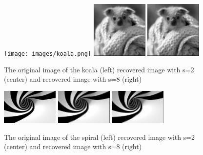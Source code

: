 \documentclass{article}
\begin{document}
\begin{figure}[h]
    \captionsetup{width=.5\linewidth}
    \centering
        \texttt{[image: images/koala.png]}
        \includegraphics[width=0.25\textwidth]{images/koala-recovered_02.png}
        \includegraphics[width=0.25\textwidth]{images/koala-recovered_08.png}
        \caption{The original image of the koala (left) recovered image with s=2 (center) and recovered image with s=8 (right)}
\end{figure}

\begin{figure}[h]
    \captionsetup{width=.5\linewidth}
    \centering
        \includegraphics[width=0.25\textwidth]{images/spiral.png}
        \includegraphics[width=0.25\textwidth]{images/spiral-recovered_02.png}
        \includegraphics[width=0.25\textwidth]{images/spiral-recovered_08.png}
        \caption{The original image of the spiral (left) recovered image with s=2 (center) and recovered image with s=8 (right)}
\end{figure}
\end{document}
